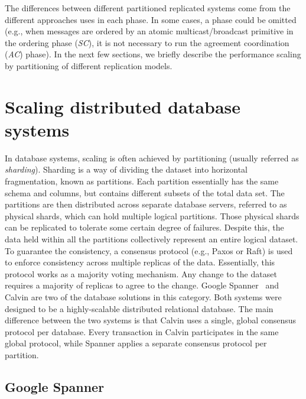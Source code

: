 The differences between different partitioned replicated systems come from the
different approaches uses in each phase. In some cases, a phase could be omitted
(e.g., when messages are ordered by an atomic multicast/broadcast primitive in
the ordering phase (\emph{SC}), it is not necessary to run the agreement
coordination (\emph{AC}) phase). In the next few sections, we briefly describe the
performance scaling by partitioning of different replication models.

\section{Scaling distributed database systems}

In database systems, scaling is often achieved by partitioning (usually referred
as \emph{sharding}). Sharding is a way of dividing the dataset into horizontal
fragmentation, known as partitions. Each partition essentially has the same
schema and columns, but contains different subsets of the total data set. The
partitions are then distributed across separate database servers, referred to as
physical shards, which can hold multiple logical partitions. Those physical
shards can be replicated to tolerate some certain degree of failures. Despite
this, the data held within all the partitions collectively represent an entire
logical dataset. To guarantee the consistency, a consensus protocol (e.g., Paxos
or Raft) is used  to enforce consistency across multiple replicas of the data.
Essentially, this protocol works as a majority voting mechanism. Any change to
the dataset requires a majority of replicas to agree to the change. Google
Spanner~\cite{corbett2013spanner} and Calvin \cite{calvin} are two of the
database solutions in this category. Both systems were designed to be a
highly-scalable distributed relational database. The main difference between the
two systems is that Calvin uses a single, global consensus protocol per
database. Every transaction in Calvin participates in the same global protocol,
while Spanner applies a separate consensus protocol per partition.


\subsection{Google Spanner}

